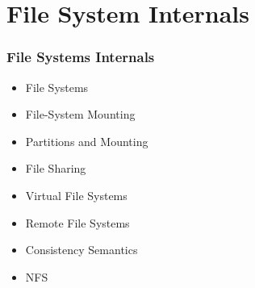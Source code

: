 \documentclass[aspectratio=169, xcolor=table, notheorems, hyperref={pdfpagelabels=false}]{beamer}
\begin{document}
\section{File System Internals}
\begin{frame}[fragile]
\frametitle{File Systems Internals}
\begin{itemize}
\item File Systems
\item File-System Mounting
\item Partitions and Mounting
\item File Sharing
\item Virtual File Systems
\item Remote File Systems
\item Consistency Semantics
\item NFS
\end{itemize}
\begin{table}
\end{table}
\end{frame}

\end{document}
